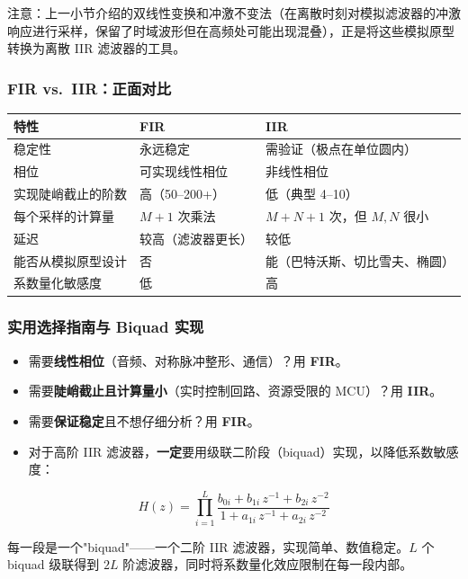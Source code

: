 注意：上一小节介绍的双线性变换和冲激不变法（在离散时刻对模拟滤波器的冲激响应进行采样，保留了时域波形但在高频处可能出现混叠），正是将这些模拟原型转换为离散 IIR 滤波器的工具。

\subsubsection{FIR vs.\ IIR：正面对比}

\begin{center}
\begin{tabular}{lll}
\toprule
\textbf{特性} & \textbf{FIR} & \textbf{IIR} \\
\midrule
稳定性 & 永远稳定 & 需验证（极点在单位圆内） \\
相位 & 可实现线性相位 & 非线性相位 \\
实现陡峭截止的阶数 & 高（50--200+） & 低（典型 4--10） \\
每个采样的计算量 & $M+1$ 次乘法 & $M+N+1$ 次，但 $M,N$ 很小 \\
延迟 & 较高（滤波器更长） & 较低 \\
能否从模拟原型设计 & 否 & 能（巴特沃斯、切比雪夫、椭圆） \\
系数量化敏感度 & 低 & 高 \\
\bottomrule
\end{tabular}
\end{center}

\subsubsection{实用选择指南与 Biquad 实现}

\begin{itemize}
    \item 需要\textbf{线性相位}（音频、对称脉冲整形、通信）？用 \textbf{FIR}。
    \item 需要\textbf{陡峭截止且计算量小}（实时控制回路、资源受限的 MCU）？用 \textbf{IIR}。
    \item 需要\textbf{保证稳定}且不想仔细分析？用 \textbf{FIR}。
    \item 对于高阶 IIR 滤波器，\textbf{一定}要用级联二阶段（biquad）实现，以降低系数敏感度：
\end{itemize}
\begin{equation}
H(z) = \prod_{i=1}^{L}
       \frac{b_{0i} + b_{1i}\,z^{-1} + b_{2i}\,z^{-2}}
            {1   + a_{1i}\,z^{-1} + a_{2i}\,z^{-2}}
\end{equation}

每一段是一个"biquad"——一个二阶 IIR 滤波器，实现简单、数值稳定。$L$ 个 biquad 级联得到 $2L$ 阶滤波器，同时将系数量化效应限制在每一段内部。

